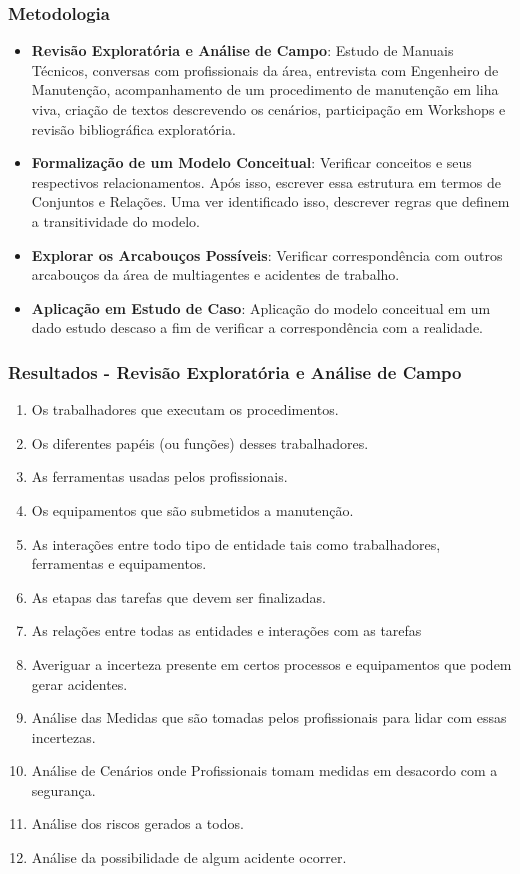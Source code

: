 \documentclass{beamer}
\begin{document}
\begin{frame}
	\frametitle{Metodologia}
	\begin{itemize}
		\item \textbf{Revisão Exploratória e Análise de Campo}: Estudo de Manuais Técnicos, conversas com profissionais da área, entrevista com Engenheiro de Manutenção, acompanhamento de um procedimento de manutenção em liha viva, criação de textos descrevendo os cenários, participação em Workshops e revisão bibliográfica exploratória.
		\item \textbf{Formalização de um Modelo Conceitual}: Verificar conceitos e seus respectivos relacionamentos. Após isso, escrever essa estrutura em termos de Conjuntos e Relações. Uma ver identificado isso, descrever regras que definem a transitividade do modelo. 
		\item \textbf{Explorar os Arcabouços Possíveis}: Verificar correspondência com outros arcabouços da área de multiagentes e acidentes de trabalho.
		\item \textbf{Aplicação em Estudo de Caso}: Aplicação do modelo conceitual em um dado estudo descaso a fim de verificar a correspondência com a realidade.
	\end{itemize} 
\end{frame}


\begin{frame}
	\frametitle{Resultados - Revisão Exploratória e Análise de Campo}
	\begin{enumerate}
		\item Os trabalhadores que executam os procedimentos.
		\item Os diferentes papéis (ou funções) desses trabalhadores.
		\item As ferramentas usadas pelos profissionais.
		\item Os equipamentos que são submetidos a manutenção.
		\item As interações entre todo tipo de entidade tais como trabalhadores, ferramentas e equipamentos.
		\item As etapas das tarefas que devem ser finalizadas. 
		\item As relações entre todas as entidades e interações com as tarefas
		\item Averiguar a incerteza presente em certos processos e equipamentos que podem gerar acidentes.
		\item Análise das Medidas que são tomadas pelos profissionais para lidar com essas incertezas.
		\item Análise de Cenários onde Profissionais tomam medidas em desacordo com a segurança.
		\item Análise dos riscos gerados a todos.
		\item Análise da possibilidade de algum acidente ocorrer.
	\end{enumerate}
\end{frame}
\end{document}
